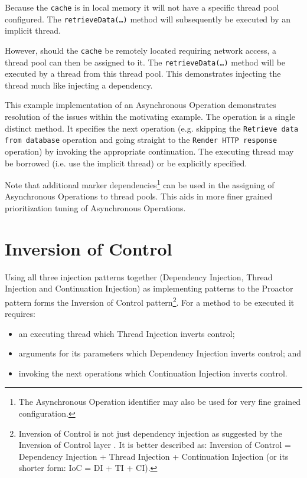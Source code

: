 \documentclass[prodmode]{style/acmlarge}
\begin{document}
Because the \texttt{cache} is in local memory it will not have a specific thread
pool configured.  The \texttt{retrieveData(\ldots)} method will subsequently be
executed by an implicit thread.

However, should the \texttt{cache} be remotely located requiring network access,
a thread pool can then be assigned to it.  The \texttt{retrieveData(\ldots)}
method will be executed by a thread from this thread pool.  This demonstrates
injecting the thread much like injecting a dependency.

This example implementation of an Asynchronous Operation demonstrates resolution
of the issues within the motivating example.  The operation is a single distinct
method.  It specifies the next operation (e.g. skipping the \texttt{Retrieve
data from database} operation and going straight to the \texttt{Render HTTP
response} operation) by invoking the appropriate continuation.  The executing
thread may be borrowed (i.e. use the implicit thread) or be explicitly
specified.

Note that additional marker dependencies\footnote{The Asynchronous Operation
identifier may also be used for very fine grained configuration.} can be used in
the assigning of Asynchronous Operations to thread pools.  This aids in more
finer grained prioritization tuning of Asynchronous Operations.



\section{Inversion of Control}

Using all three injection patterns together (Dependency Injection, Thread
Injection and Continuation Injection) as implementing patterns to the Proactor
pattern forms the Inversion of Control pattern\footnote{Inversion of Control is
not just dependency injection as suggested by the Inversion of Control layer
\cite{ioc}.  It is better described as: Inversion of Control = Dependency
Injection + Thread Injection + Continuation Injection (or its shorter form: IoC
= DI + TI + CI).}.  For a method to be executed it requires:

\begin{itemize}
  \item an executing thread which Thread Injection inverts control;
  \item arguments for its parameters which Dependency Injection inverts control; and
  \item invoking the next operations which Continuation Injection inverts control.
\end{itemize}
\end{document}
